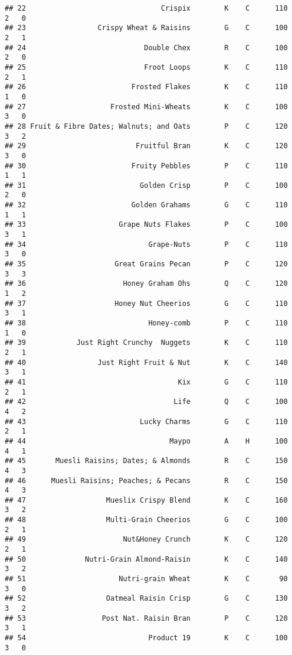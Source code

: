 \documentclass[
]{article}
\begin{document}
\begin{verbatim}
## 22                                Crispix        K    C      110       2   0
## 23                 Crispy Wheat & Raisins        G    C      100       2   1
## 24                            Double Chex        R    C      100       2   0
## 25                            Froot Loops        K    C      110       2   1
## 26                         Frosted Flakes        K    C      110       1   0
## 27                    Frosted Mini-Wheats        K    C      100       3   0
## 28 Fruit & Fibre Dates; Walnuts; and Oats        P    C      120       3   2
## 29                          Fruitful Bran        K    C      120       3   0
## 30                         Fruity Pebbles        P    C      110       1   1
## 31                           Golden Crisp        P    C      100       2   0
## 32                         Golden Grahams        G    C      110       1   1
## 33                      Grape Nuts Flakes        P    C      100       3   1
## 34                             Grape-Nuts        P    C      110       3   0
## 35                     Great Grains Pecan        P    C      120       3   3
## 36                       Honey Graham Ohs        Q    C      120       1   2
## 37                     Honey Nut Cheerios        G    C      110       3   1
## 38                             Honey-comb        P    C      110       1   0
## 39            Just Right Crunchy  Nuggets        K    C      110       2   1
## 40                 Just Right Fruit & Nut        K    C      140       3   1
## 41                                    Kix        G    C      110       2   1
## 42                                   Life        Q    C      100       4   2
## 43                           Lucky Charms        G    C      110       2   1
## 44                                  Maypo        A    H      100       4   1
## 45       Muesli Raisins; Dates; & Almonds        R    C      150       4   3
## 46      Muesli Raisins; Peaches; & Pecans        R    C      150       4   3
## 47                   Mueslix Crispy Blend        K    C      160       3   2
## 48                   Multi-Grain Cheerios        G    C      100       2   1
## 49                       Nut&Honey Crunch        K    C      120       2   1
## 50              Nutri-Grain Almond-Raisin        K    C      140       3   2
## 51                      Nutri-grain Wheat        K    C       90       3   0
## 52                   Oatmeal Raisin Crisp        G    C      130       3   2
## 53                  Post Nat. Raisin Bran        P    C      120       3   1
## 54                             Product 19        K    C      100       3   0

\end{verbatim}
\end{document}
